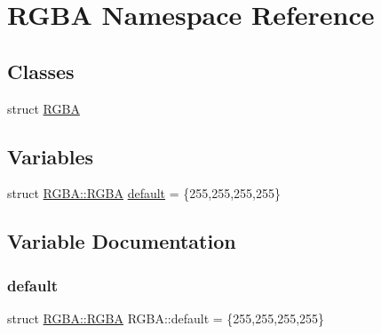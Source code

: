 \hypertarget{namespace_r_g_b_a}{}\section{R\+G\+BA Namespace Reference}
\label{namespace_r_g_b_a}
\subsection*{Classes}
\begin{DoxyCompactItemize}
\item 
struct \mbox{\hyperlink{struct_r_g_b_a_1_1_r_g_b_a}{R\+G\+BA}}
\end{DoxyCompactItemize}
\subsection*{Variables}
\begin{DoxyCompactItemize}
\item 
struct \mbox{\hyperlink{struct_r_g_b_a_1_1_r_g_b_a}{R\+G\+B\+A\+::\+R\+G\+BA}} \mbox{\hyperlink{namespace_r_g_b_a_aacebe7159d7a9c226f9b0071478063b3}{default}} = \{255,255,255,255\}
\end{DoxyCompactItemize}


\subsection{Variable Documentation}
\mbox{\label{namespace_r_g_b_a_aacebe7159d7a9c226f9b0071478063b3}} 
\subsubsection{\texorpdfstring{default}{default}}
{\footnotesize\ttfamily struct \mbox{\hyperlink{struct_r_g_b_a_1_1_r_g_b_a}{R\+G\+B\+A\+::\+R\+G\+BA}}  R\+G\+B\+A\+::default = \{255,255,255,255\}}

